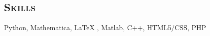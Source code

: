 \documentclass[line, margin]{res}
\begin{document}
\begin{resume}
\section{\textsc{Skills}}
Python, Mathematica, \LaTeX{} , Matlab, C++, HTML5/CSS, PHP
%
%
%
%
%
%

\end{resume}
\end{document}
